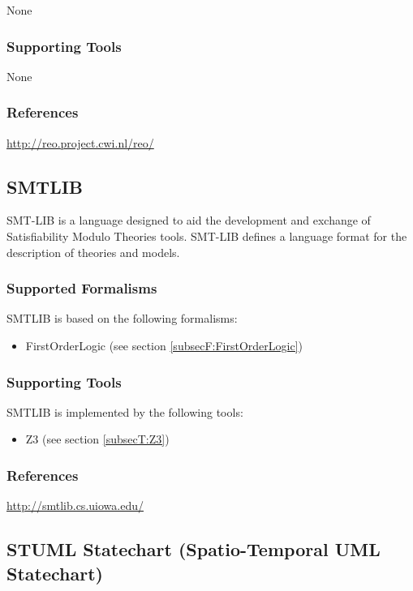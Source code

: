 None


\subsubsection{Supporting Tools}

None


\subsubsection{References}

\url{http://reo.project.cwi.nl/reo/}



\subsection{SMT\textunderscore LIB}
\label{subsecL:SMT_LIB}

SMT-LIB is a language designed to aid the development and exchange of Satisfiability Modulo Theories tools.
SMT-LIB defines a language format for the description of theories and models.

\subsubsection{Supported Formalisms}

SMT\textunderscore LIB is based on the following formalisms:
\begin{itemize}
	\item FirstOrderLogic (see section \ref{subsecF:FirstOrderLogic})
\end{itemize}


\subsubsection{Supporting Tools}

SMT\textunderscore LIB is implemented by the following tools:
\begin{itemize}
	\item Z3 (see section \ref{subsecT:Z3})
\end{itemize}


\subsubsection{References}


\url{http://smtlib.cs.uiowa.edu/}


\subsection{STUML Statechart (Spatio-Temporal UML Statechart)}
\label{subsecL:STUML}

